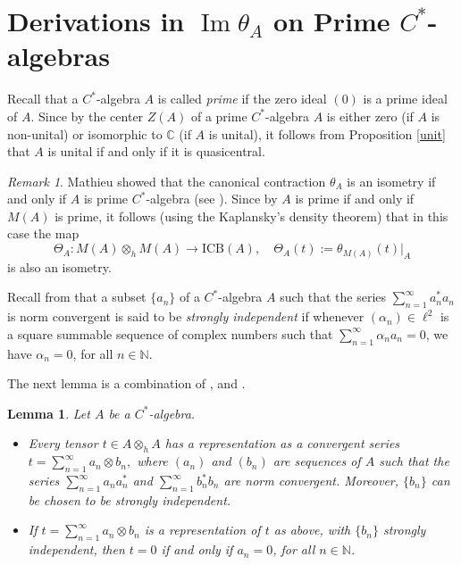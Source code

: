 \documentclass[]{amsart}
\newtheorem{lemma}[theorem]{Lemma}
\theoremstyle{remark}
\newtheorem{remark}[theorem]{Remark}
\theoremstyle{definition}
\theoremstyle{question}
\numberwithin{equation}{section}
\begin{document}
\section{Derivations in ${\mathop{\mathrm{Im}}} \theta_A$ on Prime $C^*$-algebras}

Recall that a $C^*$-algebra $A$ is called \textit{prime} if the zero ideal $(0)$
is a prime ideal of $A$. Since by \cite[1.2.47]{Ara} the center $Z(A)$ of a prime
$C^*$-algebra $A$ is either zero (if $A$ is non-unital) or isomorphic to ${\mathbb{C}}$
(if $A$ is unital), it follows from Proposition \ref{unit} that $A$ is unital if and only if
it is quasicentral.

\begin{remark}\label{rs}
Mathieu showed that the canonical contraction $\theta_A$ is an isometry if and only
if $A$ is prime $C^*$-algebra (see \cite[5.4.11]{Ara}). Since by \cite[1.1.7]{Ara} $A$ is prime if and only if $M(A)$ is prime, it follows
(using the Kaplansky's density theorem)
that in this case the map $$\Theta_A : M(A) \otimes_h M(A) \to \mathrm{ICB}(A), \quad \Theta_A(t):=\theta_{M(A)}(t)|_A$$
is also an isometry.
\end{remark}

Recall from \cite[3.2]{Smi} that a subset $\{a_n\}$ of a
$C^*$-algebra $A$ such that the series $\sum_{n=1}^\infty a_n^*a_n$
is norm convergent is said to be \textit{strongly independent} if
whenever  $(\alpha_n) \in \ell^2$ is a square summable sequence of complex
numbers such that $\sum_{n=1}^\infty \alpha_n a_n=0$, we have $\alpha_n=0$, for
all $n \in {\mathbb{N}}$.

The next lemma is a combination of \cite[1.5.6]{Ble}, \cite[4.1]{Smi} and
\cite[2.3]{ASS}.
\begin{lemma}\label{rep} Let $A$ be a $C^*$-algebra.
\begin{itemize}
\item[(a)] Every tensor $t \in A \otimes_h A$ has a representation as a
convergent series $t=\sum_{n=1}^\infty a_n \otimes b_n,$ where $(a_n)$ and
$(b_n)$ are sequences of $A$ such that the series $\sum_{n=1}^\infty a_n a_n^*$
and $\sum_{n=1}^\infty b_n^*b_n$ are norm convergent. Moreover, $\{b_n\}$ can be chosen to be strongly independent.
\item[(b)] If $t=\sum_{n=1}^\infty a_n \otimes b_n$ is a representation of $t$
as above, with $\{b_n\}$ strongly independent, then $t=0$ if and only if $a_n=0$,
for all $n \in {\mathbb{N}}$.
\end{itemize}
 \end{lemma}
\end{document}
